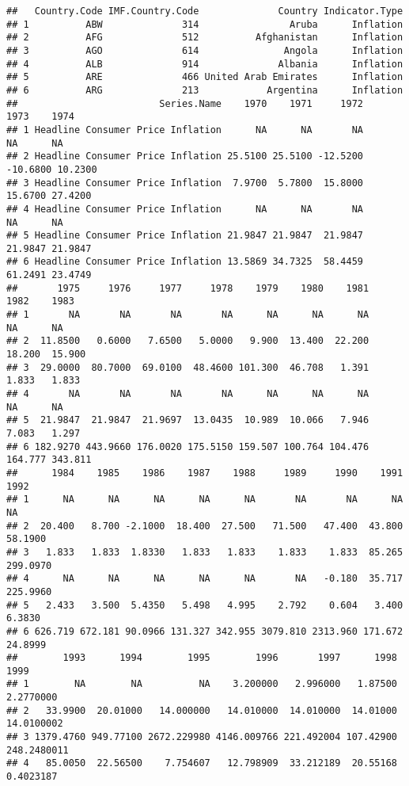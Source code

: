 \documentclass[
]{article}
\begin{document}
\begin{verbatim}
##   Country.Code IMF.Country.Code              Country Indicator.Type
## 1          ABW              314                Aruba      Inflation
## 2          AFG              512          Afghanistan      Inflation
## 3          AGO              614               Angola      Inflation
## 4          ALB              914              Albania      Inflation
## 5          ARE              466 United Arab Emirates      Inflation
## 6          ARG              213            Argentina      Inflation
##                         Series.Name    1970    1971     1972     1973    1974
## 1 Headline Consumer Price Inflation      NA      NA       NA       NA      NA
## 2 Headline Consumer Price Inflation 25.5100 25.5100 -12.5200 -10.6800 10.2300
## 3 Headline Consumer Price Inflation  7.9700  5.7800  15.8000  15.6700 27.4200
## 4 Headline Consumer Price Inflation      NA      NA       NA       NA      NA
## 5 Headline Consumer Price Inflation 21.9847 21.9847  21.9847  21.9847 21.9847
## 6 Headline Consumer Price Inflation 13.5869 34.7325  58.4459  61.2491 23.4749
##       1975     1976     1977     1978    1979    1980    1981    1982    1983
## 1       NA       NA       NA       NA      NA      NA      NA      NA      NA
## 2  11.8500   0.6000   7.6500   5.0000   9.900  13.400  22.200  18.200  15.900
## 3  29.0000  80.7000  69.0100  48.4600 101.300  46.708   1.391   1.833   1.833
## 4       NA       NA       NA       NA      NA      NA      NA      NA      NA
## 5  21.9847  21.9847  21.9697  13.0435  10.989  10.066   7.946   7.083   1.297
## 6 182.9270 443.9660 176.0020 175.5150 159.507 100.764 104.476 164.777 343.811
##      1984    1985    1986    1987    1988     1989     1990    1991     1992
## 1      NA      NA      NA      NA      NA       NA       NA      NA       NA
## 2  20.400   8.700 -2.1000  18.400  27.500   71.500   47.400  43.800  58.1900
## 3   1.833   1.833  1.8330   1.833   1.833    1.833    1.833  85.265 299.0970
## 4      NA      NA      NA      NA      NA       NA   -0.180  35.717 225.9960
## 5   2.433   3.500  5.4350   5.498   4.995    2.792    0.604   3.400   6.3830
## 6 626.719 672.181 90.0966 131.327 342.955 3079.810 2313.960 171.672  24.8999
##        1993      1994        1995        1996       1997      1998        1999
## 1        NA        NA          NA    3.200000   2.996000   1.87500   2.2770000
## 2   33.9900  20.01000   14.000000   14.010000  14.010000  14.01000  14.0100002
## 3 1379.4760 949.77100 2672.229980 4146.009766 221.492004 107.42900 248.2480011
## 4   85.0050  22.56500    7.754607   12.798909  33.212189  20.55168   0.4023187

\end{verbatim}
\end{document}
